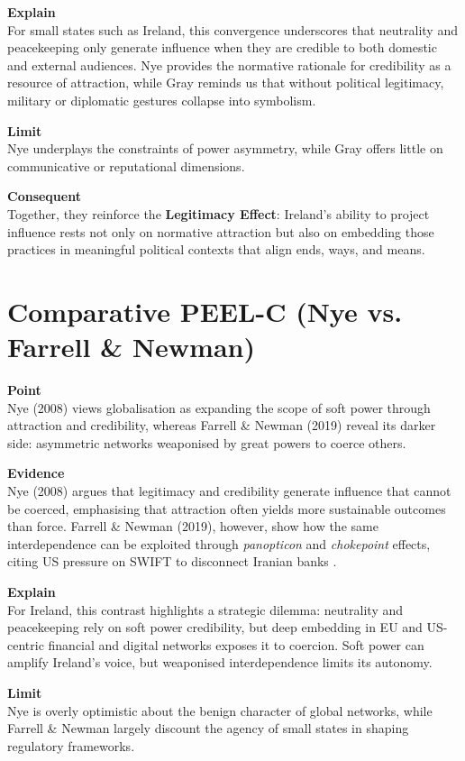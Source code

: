 \textbf{Explain} \\  
For small states such as Ireland, this convergence underscores that neutrality and peacekeeping only generate influence when they are credible to both domestic and external audiences. Nye provides the normative rationale for credibility as a resource of attraction, while Gray reminds us that without political legitimacy, military or diplomatic gestures collapse into symbolism.  

\textbf{Limit} \\  
Nye underplays the constraints of power asymmetry, while Gray offers little on communicative or reputational dimensions.  

\textbf{Consequent} \\  
Together, they reinforce the \textbf{Legitimacy Effect}: Ireland’s ability to project influence rests not only on normative attraction but also on embedding those practices in meaningful political contexts that align ends, ways, and means.


\section*{Comparative PEEL-C (Nye vs. Farrell \& Newman)}

\textbf{Point} \\  
Nye (2008) views globalisation as expanding the scope of soft power through attraction and credibility, whereas Farrell \& Newman (2019) reveal its darker side: asymmetric networks weaponised by great powers to coerce others.  

\textbf{Evidence} \\  
Nye (2008) argues that legitimacy and credibility generate influence that cannot be coerced, emphasising that attraction often yields more sustainable outcomes than force. Farrell \& Newman (2019), however, show how the same interdependence can be exploited through \textit{panopticon} and \textit{chokepoint} effects, citing US pressure on SWIFT to disconnect Iranian banks \parencite{NYE_2008,FARRELL_2019}.  

\textbf{Explain} \\  
For Ireland, this contrast highlights a strategic dilemma: neutrality and peacekeeping rely on soft power credibility, but deep embedding in EU and US-centric financial and digital networks exposes it to coercion. Soft power can amplify Ireland’s voice, but weaponised interdependence limits its autonomy.  

\textbf{Limit} \\  
Nye is overly optimistic about the benign character of global networks, while Farrell \& Newman largely discount the agency of small states in shaping regulatory frameworks.  

